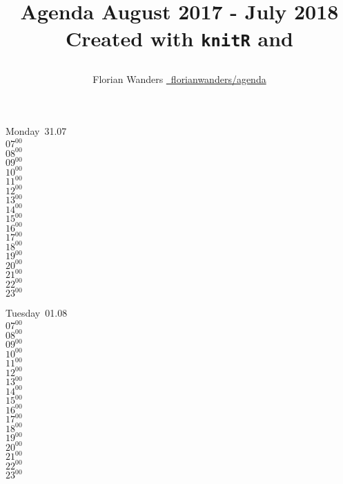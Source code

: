 \documentclass[11pt, a4paper]{book}\usepackage[]{graphicx}\usepackage[]{color}
\def\lsin{\lstinline[basicstyle=\ttfamily,breaklines=true,]}%for inline verbatim
\begin{document}
\begin{titlepage}
\title{\parbox{\linewidth}{%
  \centering%
  Agenda\endgraf
  August 2017 - July 2018\endgraf\bigskip
  Created with \lsin{knitR} and \XeLaTeX
  }
}
\author{\parbox{\linewidth}{%
  \centering%
  Florian Wanders\endgraf\bigskip
  \href{https://github.com/FlorianWanders/agenda}{\faGithub~florianwanders/agenda}
  }
}
\date{}
\maketitle
\end{titlepage}




\begin{headerbox}
\end{headerbox}
\begin{weekdaybox}
  Monday~31.07\\
  { 
  \vfill
  $07^{00}$\\
$08^{00}$\\
$09^{00}$\\
$10^{00}$\\
$11^{00}$\\
$12^{00}$\\
$13^{00}$\\
$14^{00}$\\
$15^{00}$\\
$16^{00}$\\
$17^{00}$\\
$18^{00}$\\
$19^{00}$\\
$20^{00}$\\
$21^{00}$\\
$22^{00}$\\
$23^{00}$\\
  }
\end{weekdaybox}
\begin{weekdaybox}
  Tuesday~01.08\\
  { 
  \vfill
  $07^{00}$\\
$08^{00}$\\
$09^{00}$\\
$10^{00}$\\
$11^{00}$\\
$12^{00}$\\
$13^{00}$\\
$14^{00}$\\
$15^{00}$\\
$16^{00}$\\
$17^{00}$\\
$18^{00}$\\
$19^{00}$\\
$20^{00}$\\
$21^{00}$\\
$22^{00}$\\
$23^{00}$\\
  }
\end{weekdaybox}
\end{document}
